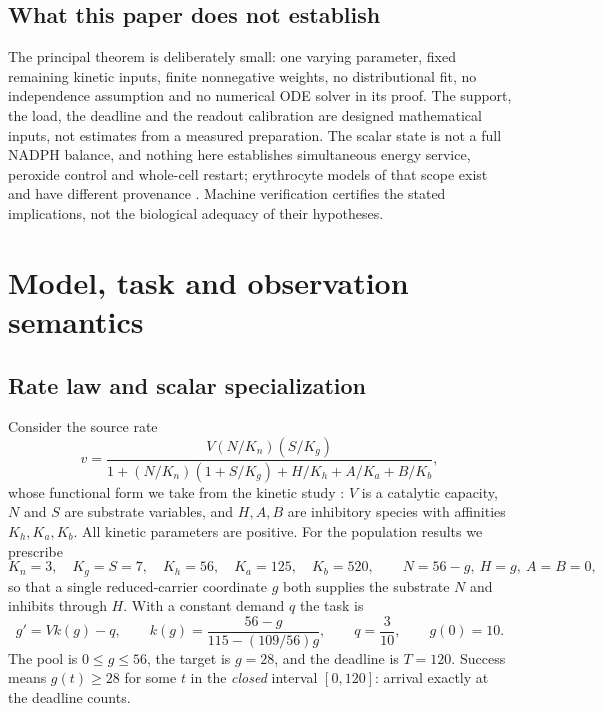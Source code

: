 \documentclass[11pt]{article}
\theoremstyle{definition}
\begin{document}
\subsection*{What this paper does not establish}
The principal theorem is deliberately small: one varying parameter, fixed
remaining kinetic inputs, finite nonnegative weights, no distributional fit, no
independence assumption and no numerical ODE solver in its proof. The support,
the load, the deadline and the readout calibration are designed mathematical
inputs, not estimates from a measured preparation. The scalar state is not a
full NADPH balance, and nothing here establishes simultaneous energy service,
peroxide control and whole-cell restart; erythrocyte models of that scope exist
and have different provenance \cite{nishino,rbcgem}. Machine verification
certifies the stated implications, not the biological adequacy of their
hypotheses.

\section{Model, task and observation semantics}\label{sec:model}

\subsection{Rate law and scalar specialization}
Consider the source rate
\begin{equation}\label{eq:source}
  v=\frac{V(N/K_n)(S/K_g)}
  {1+(N/K_n)(1+S/K_g)+H/K_h+A/K_a+B/K_b},
\end{equation}
whose functional form we take from the kinetic study \cite{shimo}: $V$ is a
catalytic capacity, $N$ and $S$ are substrate variables, and $H,A,B$ are
inhibitory species with affinities $K_h,K_a,K_b$. All kinetic parameters are
positive. For the population results we prescribe
\begin{equation}\label{eq:special}
  K_n=3,\quad K_g=S=7,\quad K_h=56,\quad K_a=125,\quad K_b=520,
  \qquad N=56-g,\ H=g,\ A=B=0,
\end{equation}
so that a single reduced-carrier coordinate $g$ both supplies the substrate
$N$ and inhibits through $H$. With a constant demand $q$ the task is
\begin{equation}\label{eq:ode}
  g'=V k(g)-q,\qquad
  k(g)=\frac{56-g}{115-(109/56)g},\qquad q=\frac3{10},\qquad g(0)=10 .
\end{equation}
The pool is $0\le g\le56$, the target is $g=28$, and the deadline is $T=120$.
Success means $g(t)\ge28$ for some $t$ in the \emph{closed} interval
$[0,120]$: arrival exactly at the deadline counts.
\end{document}

